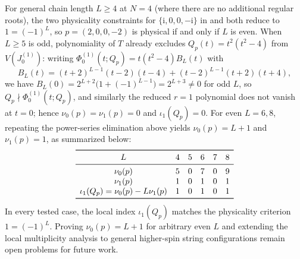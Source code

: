 \documentclass[11pt]{article}
\theoremstyle{definition}
\newcommand{\ii}{\mathrm{i}}
\begin{document}
For general chain length $L\ge 4$ at $N=4$ (where there are no additional regular roots), the two physicality constraints for $\{\ii,0,0,-\ii\}$ in \cite[Section~B.2.1, eq.~(B.16)]{HNS2014} and \cite[Section~4.1, eq.~(4.21)]{HJJ2024} both reduce to $1=(-1)^L$, so $p=(2,0,0,-2)$ is physical if and only if $L$ is even.
When $L\ge 5$ is odd, polynomiality of $T$ already excludes $Q_p(t)=t^2(t^2-4)$ from $V(J_0^{(1)})$: writing $\Phi_0^{(1)}(t;Q_p)=t(t^2-4)B_L(t)$ with
\[
 B_L(t)=(t+2)^{L-1}(t-2)(t-4)
       +(t-2)^{L-1}(t+2)(t+4),
\]
we have $B_L(0)=2^{L+2}\bigl(1+(-1)^{L-1}\bigr)=2^{L+3}\ne 0$ for odd $L$, so $Q_p\nmid\Phi_0^{(1)}(t;Q_p)$, and similarly the reduced $r=1$ polynomial does not vanish at $t=0$; hence $\nu_0(p)=\nu_1(p)=0$ and $\iota_1(Q_p)=0$.
For even $L=6,8$, repeating the power-series elimination above yields $\nu_0(p)=L+1$ and $\nu_1(p)=1$, as summarized below:
\[
 \begin{array}{cccccc}
 \toprule
 L & 4 & 5 & 6 & 7 & 8 \\
 \midrule
 \nu_0(p) & 5 & 0 & 7 & 0 & 9 \\
 \nu_1(p) & 1 & 0 & 1 & 0 & 1 \\
 \iota_1(Q_p)=\nu_0(p)-L\nu_1(p) & 1 & 0 & 1 & 0 & 1 \\
 \bottomrule
 \end{array}
\]
In every tested case, the local index $\iota_1(Q_p)$ matches the physicality criterion $1=(-1)^L$. Proving $\nu_0(p)=L+1$ for arbitrary even $L$ and extending the local multiplicity analysis to general higher-spin string configurations remain open problems for future work.
\end{document}
